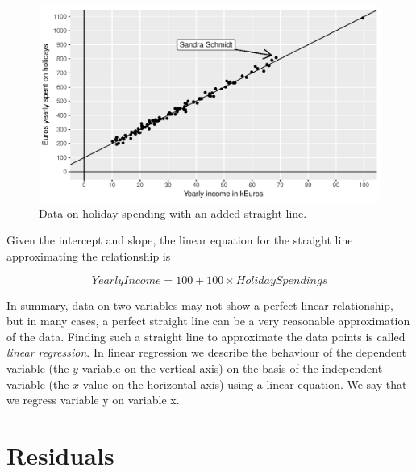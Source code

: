 \documentclass[]{report}\usepackage[]{graphicx}\usepackage[]{color}
\makeatletter
\def\maxwidth{ %
  \ifdim\Gin@nat@width>\linewidth
    \linewidth
  \else
    \Gin@nat@width
  \fi
}
\newenvironment{knitrout}{}{} %
\makeatother
\begin{document}
\begin{knitrout}
\color{fgcolor}\begin{figure}

{\centering \includegraphics[width=\maxwidth]{figure/lm_9-1} 

}

\caption[Data on holiday spending with an added straight line]{Data on holiday spending with an added straight line.}\label{fig:lm_9}
\end{figure}


\end{knitrout}

Given the intercept and slope, the linear equation for the straight line approximating the relationship is

\begin{equation}
YearlyIncome = 100 + 100 \times HolidaySpendings
\end{equation}

In summary, data on two variables may not show a perfect linear relationship, but in many cases, a perfect straight line can be a very reasonable approximation of the data. Finding such a straight line to approximate the data points is called \textit{linear regression}. In linear regression we describe the behaviour of the dependent variable (the $y$-variable on the vertical axis) on the basis of the independent variable (the $x$-value on the horizontal axis) using a linear equation. We say that we regress variable y on variable x.




\section{Residuals}
\end{document}
